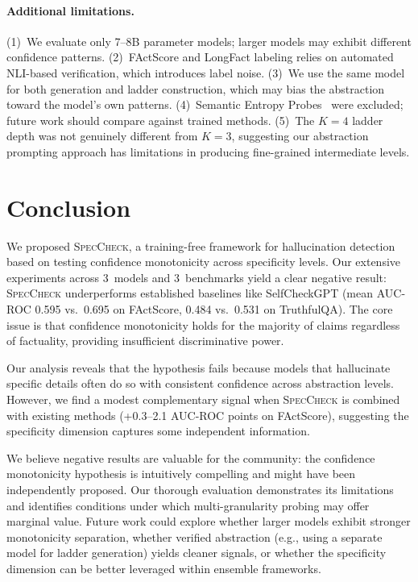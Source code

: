 \documentclass{article}
\newcommand{\speccheck}{\textsc{SpecCheck}}
\begin{document}
\paragraph{Additional limitations.}
(1)~We evaluate only 7--8B parameter models; larger models may exhibit different confidence patterns.
(2)~FActScore and LongFact labeling relies on automated NLI-based verification, which introduces label noise.
(3)~We use the same model for both generation and ladder construction, which may bias the abstraction toward the model's own patterns.
(4)~Semantic Entropy Probes~\citep{kossen2024semantic} were excluded; future work should compare against trained methods.
(5)~The $K{=}4$ ladder depth was not genuinely different from $K{=}3$, suggesting our abstraction prompting approach has limitations in producing fine-grained intermediate levels.


\section{Conclusion}
\label{sec:conclusion}

We proposed \speccheck{}, a training-free framework for hallucination detection based on testing confidence monotonicity across specificity levels.
Our extensive experiments across 3~models and 3~benchmarks yield a clear negative result: \speccheck{} underperforms established baselines like SelfCheckGPT (mean AUC-ROC 0.595 vs.\ 0.695 on FActScore, 0.484 vs.\ 0.531 on TruthfulQA).
The core issue is that confidence monotonicity holds for the majority of claims regardless of factuality, providing insufficient discriminative power.

Our analysis reveals that the hypothesis fails because models that hallucinate specific details often do so with consistent confidence across abstraction levels.
However, we find a modest complementary signal when \speccheck{} is combined with existing methods (+0.3--2.1 AUC-ROC points on FActScore), suggesting the specificity dimension captures some independent information.

We believe negative results are valuable for the community: the confidence monotonicity hypothesis is intuitively compelling and might have been independently proposed.
Our thorough evaluation demonstrates its limitations and identifies conditions under which multi-granularity probing may offer marginal value.
Future work could explore whether larger models exhibit stronger monotonicity separation, whether verified abstraction (e.g., using a separate model for ladder generation) yields cleaner signals, or whether the specificity dimension can be better leveraged within ensemble frameworks.
\end{document}
